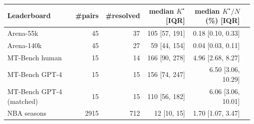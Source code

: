 \begin{tabular}{lrrrrr}
\toprule
 Leaderboard & \#pairs & \#resolved & median $K^\star$ [IQR] & median $K^\star/N$ (\%) [IQR] \\
\midrule
Arena-55k & 45 & 37 & 105 [57, 191] & 0.18 [0.10, 0.33] \\
Arena-140k & 45 & 27 & 59 [44, 154] & 0.04 [0.03, 0.11] \\
MT-Bench human & 15 & 14 & 166 [90, 278] & 4.96 [2.68, 8.27] \\
MT-Bench GPT-4 & 15 & 15 & 156 [74, 247] & 6.50 [3.06, 10.29] \\
MT-Bench GPT-4 (matched) & 15 & 15 & 110 [56, 182] & 6.06 [3.06, 10.01] \\
NBA seasons & 2915 & 712 & 12 [10, 15] & 1.70 [1.07, 3.47] \\
\bottomrule
\end{tabular}
